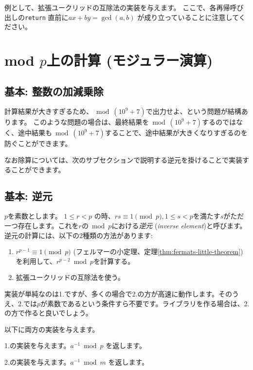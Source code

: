 \documentclass{jsarticle}
\begin{document}
  例として、拡張ユークリッドの互除法の実装を与えます。
  ここで、各再帰呼び出しの\verb+return+ 直前に$ax+by=\gcd(a,b)$ が成り立っていることに注意してください。
  
 \section{mod $p$上の計算 (モジュラー演算)}
 \label{sec:mod-p-arithmetic}
  \subsection{基本: 整数の加減乗除}
  計算結果が大きすぎるため、${} \bmod (10^9+7)$で出力せよ、という問題が結構あります。
  このような問題の場合は、最終結果を${} \bmod (10^9+7)$するのではなく、途中結果も${} \bmod (10^9+7)$することで、途中結果が大きくなりすぎるのを防ぐことができます。

  なお除算については、次のサブセクションで説明する逆元を掛けることで実装することができます。
  \subsection{基本: 逆元}
  \label{subsec:inverse-element}
  $p$を素数とします。
  $1 \le r < p$ の時、$rs \equiv 1 \pmod p, 1 \le s < p$を満たす$s$がただ一つ存在します。これを$r$の${} \bmod p$における\emph{逆元} (\emph{inverse element})と呼びます。
  逆元の計算には、以下の2種類の方法があります:
  \begin{enumerate}
   \item $r^{p-1} \equiv 1 \pmod p$ (フェルマーの小定理、定理\ref{thm:fermats-little-theorem})を利用して、$r^{p-2} \bmod p$を計算する。
   \item 拡張ユークリッドの互除法を使う。
  \end{enumerate}
  実装が単純なのは1.ですが、多くの場合で2.の方が高速に動作します。そのうえ、2.では$p$が素数であるという条件すら不要です。ライブラリを作る場合は、2.の方で作ると良いでしょう。

  以下に両方の実装を与えます。

  1.の実装を与えます。$a^{-1} \bmod p$ を返します。
  

  2.の実装を与えます。$a^{-1} \bmod m$ を返します。
  
\end{document}
